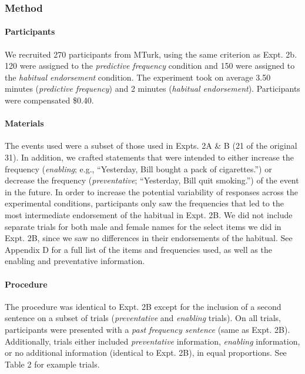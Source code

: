 \documentclass[english,,man,floatsintext]{apa6}
\let\oldparagraph\paragraph
\renewcommand{\paragraph}[1]{\oldparagraph{#1}\mbox{}}
\theoremstyle{definition}
\theoremstyle{definition}
\theoremstyle{definition}
\theoremstyle{remark}
\begin{document}
\hypertarget{method-4}{%
\subsubsection{Method}\label{method-4}}

\hypertarget{participants-4}{%
\paragraph{Participants}\label{participants-4}}

We recruited 270 participants from MTurk, using the same criterion as
Expt. 2b. 120 were assigned to the \emph{predictive frequency} condition
and 150 were assigned to the \emph{habitual endorsement} condition. The
experiment took on average 3.50 minutes (\emph{predictive frequency})
and 2 minutes (\emph{habitual endorsement}). Participants were
compensated \$0.40.

\hypertarget{materials-2}{%
\paragraph{Materials}\label{materials-2}}

The events used were a subset of those used in Expts. 2A \& B (21 of the
original 31). In addition, we crafted statements that were intended to
either increase the frequency (\emph{enabling}; e.g.,
\enquote{Yesterday, Bill bought a pack of cigarettes.}) or decrease the
frequency (\emph{preventative}; \enquote{Yesterday, Bill quit smoking.})
of the event in the future. In order to increase the potential
variability of responses across the experimental conditions,
participants only saw the frequencies that led to the most intermediate
endorsement of the habitual in Expt. 2B. We did not include separate
trials for both male and female names for the select items we did in
Expt. 2B, since we saw no differences in their endorsements of the
habitual. See Appendix D for a full list of the items and frequencies
used, as well as the enabling and preventative information.

\hypertarget{procedure-2}{%
\paragraph{Procedure}\label{procedure-2}}

The procedure was identical to Expt. 2B except for the inclusion of a
second sentence on a subset of trials (\emph{preventative} and
\emph{enabling} trials). On all trials, participants were presented with
a \emph{past frequency sentence} (same as Expt. 2B). Additionally,
trials either included \emph{preventative} information, \emph{enabling}
information, or no additional information (identical to Expt. 2B), in
equal proportions. See Table 2 for example trials.
\end{document}
